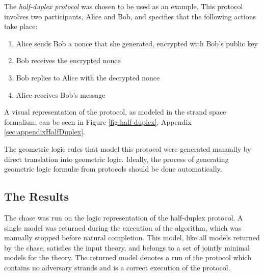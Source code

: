 		The \emph{half-duplex protocol} was chosen to be used as an example.
		This protocol involves two participants, Alice and Bob, and specifies
		that the following actions take place:

		\begin{enumerate}
		\item Alice sends Bob a nonce that she generated, encrypted with Bob's public key
		\item Bob receives the encrypted nonce
		\item Bob replies to Alice with the decrypted nonce
		\item Alice receives Bob's message
		\end{enumerate}

		A visual representation of the protocol, as modeled in the strand space
		formalism, can be seen in Figure \ref{fig:half-duplex}, Appendix
		\ref{sec:appendixHalfDuplex}.

		The geometric logic rules that model this protocol were generated
		manually by direct translation into geometric logic. Ideally, the
		process of generating geometric logic formul{\ae} from protocols should
		be done automatically.

	\subsection{The Results}

		The chase was run on the logic representation of the half-duplex protocol.
		A single model was returned during the execution of the algorithm,
		which was manually stopped before natural completion. This model, like
		all models returned by the chase, satisfies the input theory, and
		belongs to a set of jointly minimal models for the theory. The returned
		model denotes a run of the protocol which contains no adversary strands
		and is a correct execution of the protocol.
